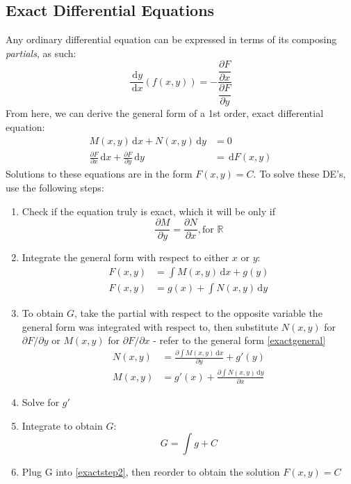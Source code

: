 \documentclass{article}
\newcommand{\ud}{\, \mathrm{d}}
\begin{document}
	\subsection{Exact Differential Equations}
		Any ordinary differential equation can be expressed in terms of its composing \emph{partials}, as such:
		\begin{equation}
			\frac{\ud y}{\ud x}(f(x, y)) = - \frac{\dfrac{\partial F}{\partial x}}{\dfrac{\partial F}{\partial y}}
		\end{equation}
		From here, we can derive the general form of a 1st order, exact differential equation:
		\begin{align}	\label{exactgeneral}
			M(x, y)\ud x + N(x, y)\ud y & = 0 \\
			\frac{\partial F}{\partial x}\ud x + \frac{\partial F}{\partial y}\ud y & =
			\ud F(x, y)
		\end{align}
		Solutions to these equations are in the form $F(x, y) = C$. To solve these DE's, use the following steps:
		\begin{enumerate}
			\item Check if the equation truly is exact, which it will be only if
				\begin{equation}
					\frac{\partial M}{\partial y} = \frac{\partial N}{\partial x}, \text{for $\mathbb{R}$}
				\end{equation}
			\item Integrate the general form with respect to either $x$ or $y$:
				\begin{align}	\label{exactstep2}
					F(x, y) & = \int M(x, y)\ud x + g(y) \\
					F(x, y) & = g(x) + \int N(x, y)\ud y
				\end{align}
			\item To obtain $G$, take the partial with respect to the opposite variable the general form was integrated with respect to, then substitute $N(x,y)$ for $\partial F/\partial y$ or $M(x,y)$ for $\partial F/\partial x$ - refer to the general form \eqref{exactgeneral}
				\begin{align}
					N(x, y) & = \frac{\partial \int M(x, y)\ud x}{\partial y} + g\prime(y) \\
					M(x, y) & = g\prime(x) + \frac{\partial \int N(x, y)\ud y}{\partial x}
				\end{align}
			\item Solve for $g\prime$
			\item Integrate to obtain $G$: \[G = \int g + C\]
			\item Plug G into \eqref{exactstep2}, then reorder to obtain the solution $F(x, y) = C$
		\end{enumerate}
\end{document}
